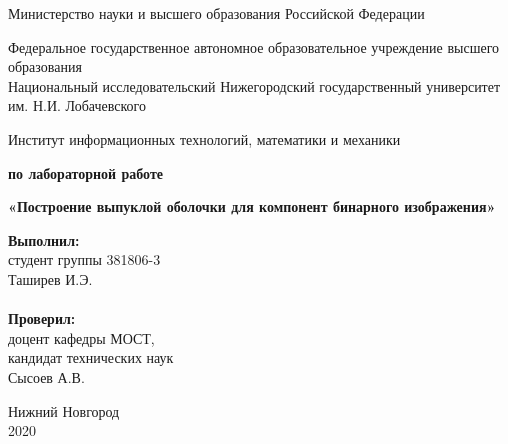 \documentclass{report}
\begin{document}
\begin{titlepage}

\begin{center}
Министерство науки и высшего образования Российской Федерации
\end{center}

\begin{center}
Федеральное государственное автономное образовательное учреждение высшего образования \\
Национальный исследовательский Нижегородский государственный университет им. Н.И. Лобачевского
\end{center}

\begin{center}
Институт информационных технологий, математики и механики
\end{center}

\vspace{4em}

\begin{center}
\textbf{ по лабораторной работе} \\
\end{center}
\begin{center}
\textbf{\Large«Построение выпуклой оболочки для компонент бинарного изображения»} \\
\end{center}

\vspace{4em}

\newbox{\lbox}
\newlength{\maxl}
\setlength{\maxl}{\wd\lbox}
\hfill\parbox{7cm}{
\hspace*{5cm}\hspace*{-5cm}\textbf{Выполнил:} \\ студент группы 381806-3 \\ Таширев И.Э.\\
\\
\hspace*{5cm}\hspace*{-5cm}\textbf{Проверил:}\\ доцент кафедры МОСТ, \\ кандидат технических наук \\ Сысоев А.В.\\
}
\vspace{\fill}

\begin{center} Нижний Новгород \\ 2020 \end{center}

\end{titlepage}
\end{document}
